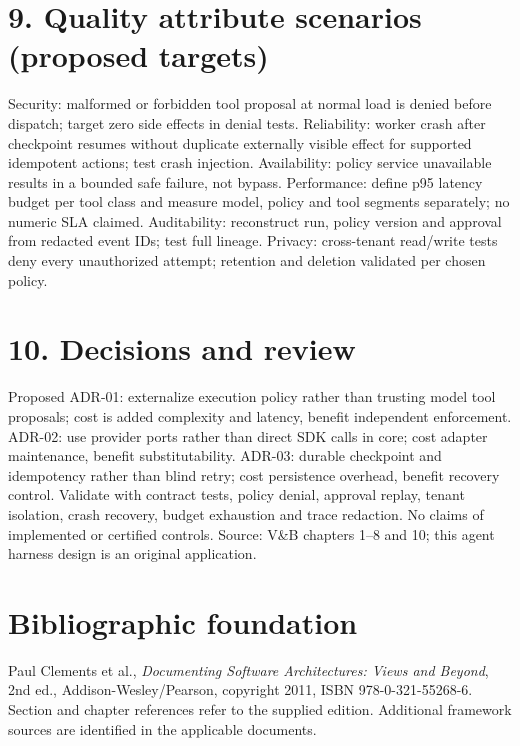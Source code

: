 \documentclass[11pt,letterpaper]{article}
\begin{document}
\section*{9. Quality attribute scenarios (proposed targets)}
Security: malformed or forbidden tool proposal at normal load is denied before dispatch; target zero side effects in denial tests. Reliability: worker crash after checkpoint resumes without duplicate externally visible effect for supported idempotent actions; test crash injection. Availability: policy service unavailable results in a bounded safe failure, not bypass. Performance: define p95 latency budget per tool class and measure model, policy and tool segments separately; no numeric SLA claimed. Auditability: reconstruct run, policy version and approval from redacted event IDs; test full lineage. Privacy: cross-tenant read/write tests deny every unauthorized attempt; retention and deletion validated per chosen policy.\par\smallskip
\section*{10. Decisions and review}
Proposed ADR-01: externalize execution policy rather than trusting model tool proposals; cost is added complexity and latency, benefit independent enforcement. ADR-02: use provider ports rather than direct SDK calls in core; cost adapter maintenance, benefit substitutability. ADR-03: durable checkpoint and idempotency rather than blind retry; cost persistence overhead, benefit recovery control. Validate with contract tests, policy denial, approval replay, tenant isolation, crash recovery, budget exhaustion and trace redaction. No claims of implemented or certified controls. Source: V\&B chapters 1--8 and 10; this agent harness design is an original application.\par\smallskip
\section*{Bibliographic foundation}
Paul Clements et al., \emph{Documenting Software Architectures: Views and Beyond}, 2nd ed., Addison-Wesley/Pearson, copyright 2011, ISBN 978-0-321-55268-6. Section and chapter references refer to the supplied edition. Additional framework sources are identified in the applicable documents.\par
\end{document}
